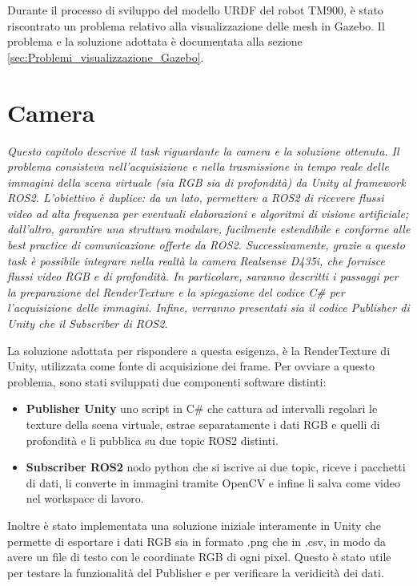 \documentclass[11pt]{report}
\begin{document}
Durante il processo di sviluppo del modello URDF del robot TM900, è stato riscontrato un problema relativo alla visualizzazione delle mesh in Gazebo. Il problema e la soluzione adottata è documentata alla sezione \ref{sec:Problemi_visualizzazione_Gazebo}.

\section{Camera}
\label{sec:camera}
\textit{Questo capitolo descrive il task riguardante la camera e la soluzione ottenuta. Il problema consisteva nell’acquisizione e nella trasmissione in tempo reale delle immagini della scena virtuale (sia RGB sia di profondità) da Unity al framework ROS2. L’obiettivo è duplice: da un lato, permettere a ROS2 di ricevere flussi video ad alta frequenza per eventuali elaborazioni e algoritmi di visione artificiale; dall’altro, garantire una struttura modulare, facilmente estendibile e conforme alle best practice di comunicazione offerte da ROS2. Successivamente, grazie a questo task è possibile integrare nella realtà la camera Realsense D435i, che fornisce flussi video RGB e di profondità. In particolare, saranno descritti i passaggi per la preparazione del RenderTexture e la spiegazione del codice C\# per l’acquisizione delle immagini. Infine, verranno presentati sia il codice Publisher di Unity che il Subscriber di ROS2.}

La soluzione adottata per rispondere a questa esigenza, è la RenderTexture di Unity, utilizzata come fonte di acquisizione dei frame. Per ovviare a questo problema, sono stati sviluppati due componenti software distinti:
\begin{itemize}
    \item \textbf{Publisher Unity} uno script in C\# che cattura ad intervalli regolari le texture della scena virtuale, estrae separatamente i dati RGB e quelli di profondità e li pubblica su due topic ROS2 distinti.

    \item \textbf{Subscriber ROS2} nodo python che si iscrive ai due topic, riceve i pacchetti di dati, li converte in immagini tramite OpenCV e infine li salva come video nel workspace di lavoro.
\end{itemize}

Inoltre è stato implementata una soluzione iniziale interamente in Unity che permette di esportare i dati RGB sia in formato .png che in .csv, in modo da avere un file di testo con le coordinate RGB di ogni pixel. Questo è stato utile per testare la funzionalità del Publisher e per verificare la veridicità dei dati.
\end{document}
